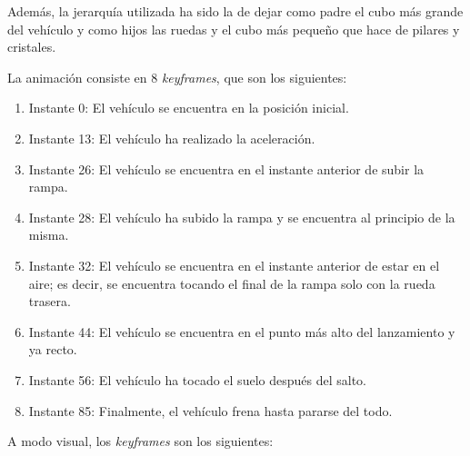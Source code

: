 \documentclass{article}
\begin{document}
Además, la jerarquía utilizada ha sido la de dejar como padre el cubo más grande del vehículo y como hijos las ruedas y el cubo más pequeño que hace de pilares y cristales.


La animación consiste en 8 \textit{keyframes}, que son los siguientes:

\begin{enumerate}
    \item Instante 0: El vehículo se encuentra en la posición inicial.
    \item Instante 13: El vehículo ha realizado la aceleración.
    \item Instante 26: El vehículo se encuentra en el instante anterior de subir la rampa.
    \item Instante 28: El vehículo ha subido la rampa y se encuentra al principio de la misma.
    \item Instante 32: El vehículo se encuentra en el instante anterior de estar en el aire; es decir, se encuentra tocando el final de la rampa solo con la rueda trasera.
    \item Instante 44: El vehículo se encuentra en el punto más alto del lanzamiento y ya recto.
    \item Instante 56: El vehículo ha tocado el suelo después del salto.
    \item Instante 85: Finalmente, el vehículo frena hasta pararse del todo.
\end{enumerate}

A modo visual, los \textit{keyframes} son los siguientes:
\end{document}
